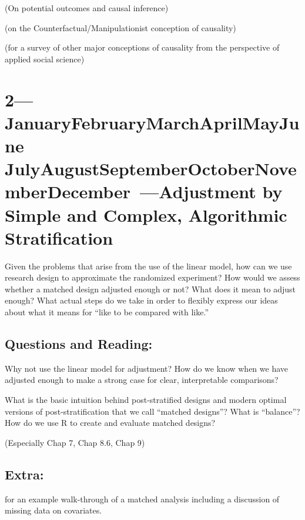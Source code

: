 \documentclass[10pt]{article}
\def\themonth{\ifcase\month\or
  January\or February\or March\or April\or May\or June\or
  July\or August\or September\or October\or November\or December\fi}
\begin{document}
\citealp[Chap 9.0 --  9.3]{gelman2007dau} (On potential outcomes and causal
inference)


\citealp[Chap 2]{angrist2009mostly}

\citealp{holland:1986a} (on the Counterfactual/Manipulationist conception of
causality)

\citealp{brady02} (for a survey of other major conceptions of causality from
the perspective of applied social science)


\AdvanceDate[1]
\section{2---\themonth~\the\day---Adjustment by Simple and Complex, Algorithmic Stratification }

Given the problems that arise from the use of the linear model, how can we use
research design to approximate the randomized experiment? How would we assess
whether a matched design adjusted enough or not? What does it mean to adjust
enough? What actual steps do we take in order to flexibly express our ideas
about what it means for ``like to be compared with like.''

\subsection{Questions and Reading:}

Why not use the linear model for adjustment? How do we know when we have
adjusted enough to make a strong case for clear, interpretable comparisons?

\citealp[Chap 6]{rosenbaum2010design}

\citealp[Chap 9.5--9.6]{gelman2007dau}

What is the basic intuition behind post-stratified designs and modern optimal
versions of post-stratification that we call ``matched designs''? What is
``balance''? How do we use R to create and evaluate matched designs?

\citealp[Chap 7--9, 13]{rosenbaum2010design} (Especially Chap 7, Chap 8.6,
Chap 9)

\subsection{Extra:}

\citealp[Chap 3]{rosenbaum2010design} 

\cite{hansen:2004a}

\cite{hansen2011qy} for an example walk-through of a matched analysis
including a discussion of missing data on covariates.
\end{document}
